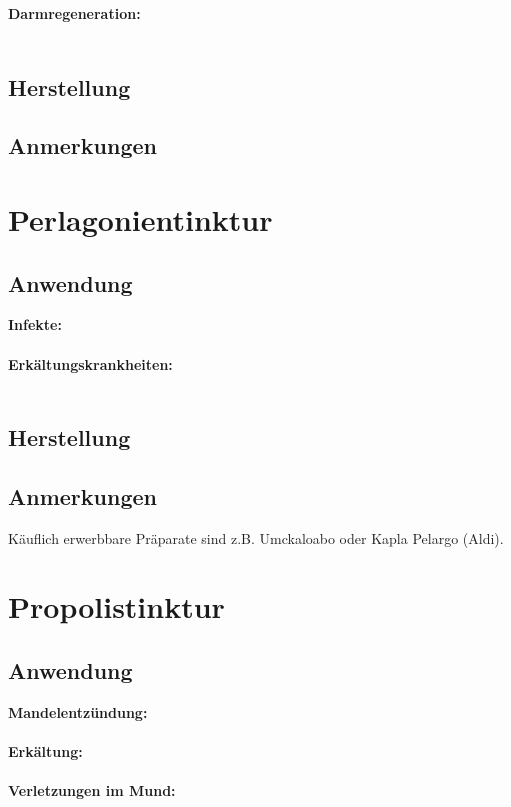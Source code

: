 \textbf{Darmregeneration:} \\ \\

\subsection{Herstellung}

\subsection{Anmerkungen}





\section{Perlagonientinktur}

\subsection{Anwendung}

\textbf{Infekte:} \\ \\
\textbf{Erkältungskrankheiten:} \\ \\


\subsection{Herstellung}

\subsection{Anmerkungen}

Käuflich erwerbbare Präparate sind z.B. Umckaloabo oder Kapla Pelargo (Aldi).



\section{Propolistinktur}

\subsection{Anwendung}

\textbf{Mandelentzündung:} \\ \\
\textbf{Erkältung:} \\ \\
\textbf{Verletzungen im Mund:} \\ \\


